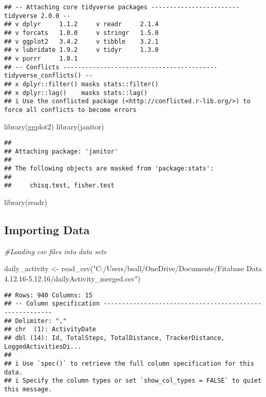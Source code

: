 \documentclass[
]{article}
\newenvironment{Shaded}{\begin{snugshade}}{\end{snugshade}}
\newcommand{\CommentTok}[1]{\textcolor[rgb]{0.56,0.35,0.01}{\textit{#1}}}
\newcommand{\FunctionTok}[1]{\textcolor[rgb]{0.00,0.00,0.00}{#1}}
\newcommand{\NormalTok}[1]{#1}
\newcommand{\OtherTok}[1]{\textcolor[rgb]{0.56,0.35,0.01}{#1}}
\newcommand{\StringTok}[1]{\textcolor[rgb]{0.31,0.60,0.02}{#1}}
\begin{document}
\begin{verbatim}
## -- Attaching core tidyverse packages ------------------------ tidyverse 2.0.0 --
## v dplyr     1.1.2     v readr     2.1.4
## v forcats   1.0.0     v stringr   1.5.0
## v ggplot2   3.4.2     v tibble    3.2.1
## v lubridate 1.9.2     v tidyr     1.3.0
## v purrr     1.0.1     
## -- Conflicts ------------------------------------------ tidyverse_conflicts() --
## x dplyr::filter() masks stats::filter()
## x dplyr::lag()    masks stats::lag()
## i Use the conflicted package (<http://conflicted.r-lib.org/>) to force all conflicts to become errors
\end{verbatim}

\begin{Shaded}
\begin{Highlighting}[]
\FunctionTok{library}\NormalTok{(ggplot2)}
\FunctionTok{library}\NormalTok{(janitor)}
\end{Highlighting}
\end{Shaded}

\begin{verbatim}
## 
## Attaching package: 'janitor'
## 
## The following objects are masked from 'package:stats':
## 
##     chisq.test, fisher.test
\end{verbatim}

\begin{Shaded}
\begin{Highlighting}[]
\FunctionTok{library}\NormalTok{(readr)}
\end{Highlighting}
\end{Shaded}

\hypertarget{importing-data}{%
\subsection{\texorpdfstring{\textbf{Importing
Data}}{Importing Data}}\label{importing-data}}

\begin{Shaded}
\begin{Highlighting}[]
\CommentTok{\#Loading csv files into data sets }

\NormalTok{daily\_activity }\OtherTok{\textless{}{-}} \FunctionTok{read\_csv}\NormalTok{(}\StringTok{"C:/Users/bsall/OneDrive/Documents/Fitabase Data 4.12.16{-}5.12.16/dailyActivity\_merged.csv"}\NormalTok{)}
\end{Highlighting}
\end{Shaded}

\begin{verbatim}
## Rows: 940 Columns: 15
## -- Column specification --------------------------------------------------------
## Delimiter: ","
## chr  (1): ActivityDate
## dbl (14): Id, TotalSteps, TotalDistance, TrackerDistance, LoggedActivitiesDi...
## 
## i Use `spec()` to retrieve the full column specification for this data.
## i Specify the column types or set `show_col_types = FALSE` to quiet this message.
\end{verbatim}
\end{document}
